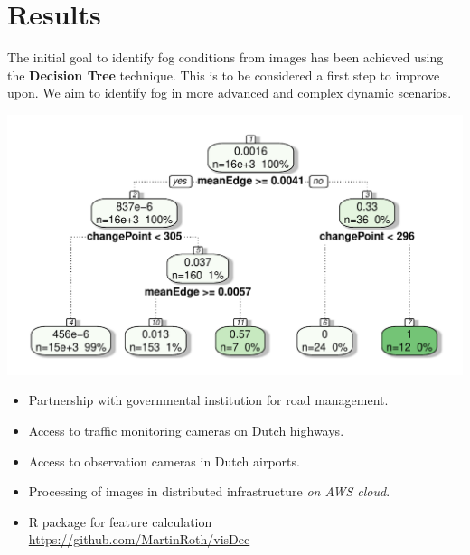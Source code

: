\documentclass{article}
\begin{document}
\section*{Results}
The initial goal to identify fog conditions from images has been achieved using 
the \textbf{Decision Tree} technique. 
This is to be considered a first step to improve upon. 
We aim to identify fog in more advanced and complex dynamic scenarios.

\begin{minipage}[b]{\columnwidth}
	\begin{center}
	\includegraphics[width=0.9\columnwidth]{ClassificationTree-1}
	\label{figTree}
	\end{center}
\end{minipage}


\begin{tcolorbox}[colback=red!5!white,colframe=red!75!black,title=Overall Project Results]
\begin{itemize}
\item{Partnership with governmental institution for road management.}
\item{Access to traffic monitoring cameras on Dutch highways.}
\item{Access to observation cameras in Dutch airports.}
\item{Processing of images in distributed infrastructure \emph{on AWS cloud}.}
\item{R package for feature calculation\\ \url{https://github.com/MartinRoth/visDec}}
\end{itemize}
\end{tcolorbox}
\end{document}
